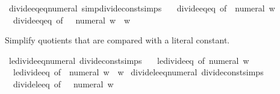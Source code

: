 \begin{isabellebody}
\ divide{\isacharunderscore}{\kern0pt}eq{\isacharunderscore}{\kern0pt}eq{\isacharunderscore}{\kern0pt}numeral{}\ {\isacharbrackleft}{\kern0pt}simp{\isacharcomma}{\kern0pt}divide{\isacharunderscore}{\kern0pt}const{\isacharunderscore}{\kern0pt}simps{\isacharbrackright}{\kern0pt}\ {\isacharequal}{\kern0pt}\isanewline
\ \ divide{\isacharunderscore}{\kern0pt}eq{\isacharunderscore}{\kern0pt}eq\ {\isacharbrackleft}{\kern0pt}of\ {\isacharunderscore}{\kern0pt}\ {\isachardoublequoteopen}numeral\ w{\isachardoublequoteclose}{\isacharbrackright}{\kern0pt}\isanewline
\ \ divide{\isacharunderscore}{\kern0pt}eq{\isacharunderscore}{\kern0pt}eq\ {\isacharbrackleft}{\kern0pt}of\ {\isacharunderscore}{\kern0pt}\ {\isachardoublequoteopen}{\isacharminus}{\kern0pt}\ numeral\ w{\isachardoublequoteclose}{\isacharbrackright}{\kern0pt}\ \ w%
\isadelimdocument
%
\endisadelimdocument
%
\isatagdocument
%
\isamarkuptrue%
%
\endisatagdocument
{\isafolddocument}%
%
\isadelimdocument
%
\endisadelimdocument
%
\begin{isamarkuptext}%
Simplify quotients that are compared with a literal constant.%
\end{isamarkuptext}\isamarkuptrue%
\isamarkupfalse%
\ le{\isacharunderscore}{\kern0pt}divide{\isacharunderscore}{\kern0pt}eq{\isacharunderscore}{\kern0pt}numeral\ {\isacharbrackleft}{\kern0pt}divide{\isacharunderscore}{\kern0pt}const{\isacharunderscore}{\kern0pt}simps{\isacharbrackright}{\kern0pt}\ {\isacharequal}{\kern0pt}\isanewline
\ \ le{\isacharunderscore}{\kern0pt}divide{\isacharunderscore}{\kern0pt}eq\ {\isacharbrackleft}{\kern0pt}of\ {\isachardoublequoteopen}numeral\ w{\isachardoublequoteclose}{\isacharbrackright}{\kern0pt}\isanewline
\ \ le{\isacharunderscore}{\kern0pt}divide{\isacharunderscore}{\kern0pt}eq\ {\isacharbrackleft}{\kern0pt}of\ {\isachardoublequoteopen}{\isacharminus}{\kern0pt}\ numeral\ w{\isachardoublequoteclose}{\isacharbrackright}{\kern0pt}\ \ w\isanewline
\isanewline
{}\isamarkupfalse%
\ divide{\isacharunderscore}{\kern0pt}le{\isacharunderscore}{\kern0pt}eq{\isacharunderscore}{\kern0pt}numeral\ {\isacharbrackleft}{\kern0pt}divide{\isacharunderscore}{\kern0pt}const{\isacharunderscore}{\kern0pt}simps{\isacharbrackright}{\kern0pt}\ {\isacharequal}{\kern0pt}\isanewline
\ \ divide{\isacharunderscore}{\kern0pt}le{\isacharunderscore}{\kern0pt}eq\ {\isacharbrackleft}{\kern0pt}of\ {\isacharunderscore}{\kern0pt}\ {\isacharunderscore}{\kern0pt}\ {\isachardoublequoteopen}numeral\ w{\isachardoublequoteclose}{\isacharbrackright}{\kern0pt}\isanewline

\end{isabellebody}
